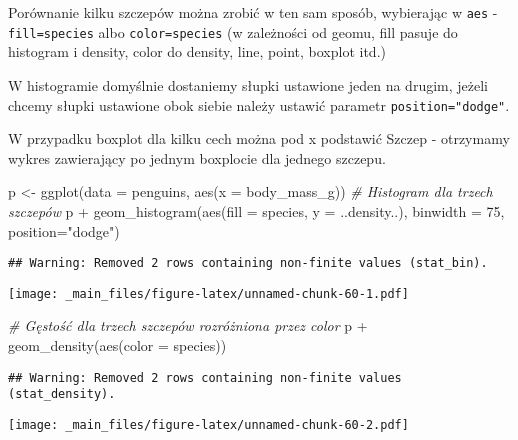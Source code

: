 \documentclass[
]{book}
\newenvironment{Shaded}{\begin{snugshade}}{\end{snugshade}}
\newcommand{\AttributeTok}[1]{\textcolor[rgb]{0.77,0.63,0.00}{#1}}
\newcommand{\CommentTok}[1]{\textcolor[rgb]{0.56,0.35,0.01}{\textit{#1}}}
\newcommand{\DecValTok}[1]{\textcolor[rgb]{0.00,0.00,0.81}{#1}}
\newcommand{\FunctionTok}[1]{\textcolor[rgb]{0.00,0.00,0.00}{#1}}
\newcommand{\NormalTok}[1]{#1}
\newcommand{\OtherTok}[1]{\textcolor[rgb]{0.56,0.35,0.01}{#1}}
\newcommand{\SpecialCharTok}[1]{\textcolor[rgb]{0.00,0.00,0.00}{#1}}
\newcommand{\StringTok}[1]{\textcolor[rgb]{0.31,0.60,0.02}{#1}}
\begin{document}
Porównanie kilku szczepów można zrobić w ten sam sposób, wybierając w \texttt{aes} - \texttt{fill=species} albo \texttt{color=species} (w zależności od geomu, fill pasuje do histogram i density, color do density, line, point, boxplot itd.)

W histogramie domyślnie dostaniemy słupki ustawione jeden na drugim, jeżeli chcemy słupki ustawione obok siebie należy ustawić parametr \texttt{position="dodge"}.

W przypadku boxplot dla kilku cech można pod x podstawić Szczep - otrzymamy wykres zawierający po jednym boxplocie dla jednego szczepu.

\begin{Shaded}
\begin{Highlighting}[]
\NormalTok{p }\OtherTok{\textless{}{-}} \FunctionTok{ggplot}\NormalTok{(}\AttributeTok{data =}\NormalTok{ penguins, }\FunctionTok{aes}\NormalTok{(}\AttributeTok{x =}\NormalTok{ body\_mass\_g))}
\CommentTok{\# Histogram dla trzech szczepów}
\NormalTok{p }\SpecialCharTok{+} \FunctionTok{geom\_histogram}\NormalTok{(}\FunctionTok{aes}\NormalTok{(}\AttributeTok{fill =}\NormalTok{ species, }\AttributeTok{y =}\NormalTok{ ..density..), }\AttributeTok{binwidth =} \DecValTok{75}\NormalTok{, }
                   \AttributeTok{position=}\StringTok{"dodge"}\NormalTok{)}
\end{Highlighting}
\end{Shaded}

\begin{verbatim}
## Warning: Removed 2 rows containing non-finite values (stat_bin).
\end{verbatim}

\texttt{[image: \_main\_files/figure-latex/unnamed-chunk-60-1.pdf]}

\begin{Shaded}
\begin{Highlighting}[]
\CommentTok{\# Gęstość dla trzech szczepów rozróżniona przez color}
\NormalTok{p }\SpecialCharTok{+} \FunctionTok{geom\_density}\NormalTok{(}\FunctionTok{aes}\NormalTok{(}\AttributeTok{color =}\NormalTok{ species))}
\end{Highlighting}
\end{Shaded}

\begin{verbatim}
## Warning: Removed 2 rows containing non-finite values (stat_density).
\end{verbatim}

\texttt{[image: \_main\_files/figure-latex/unnamed-chunk-60-2.pdf]}
\end{document}
